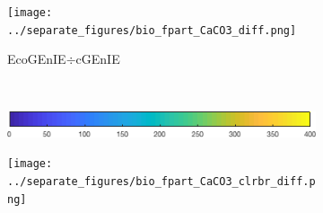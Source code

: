 \documentclass{article}
\begin{document}
\begin{figure}[htp]
\begin{subfigure}{.33\textwidth}
 \label{fig:dpCO2_2}
\end{subfigure}
\begin{subfigure}{.33\textwidth}
 \caption{EcoGEnIE$\div$cGEnIE}
\texttt{[image: ../separate\_figures/bio\_fpart\_CaCO3\_diff.png]}
 \label{fig:dpCO2_2}
\end{subfigure}
\\[+0.2cm]
\begin{subfigure}{.49\textwidth}
 \includegraphics[width=0.95\linewidth]{../separate_figures/ECOGEM/bio_fpart_CaCO3_clrbr.png}
\end{subfigure}
\begin{subfigure}{.49\textwidth}
\texttt{[image: ../separate\_figures/bio\_fpart\_CaCO3\_clrbr\_diff.png]}
\end{subfigure}
\end{figure}
\end{document}
